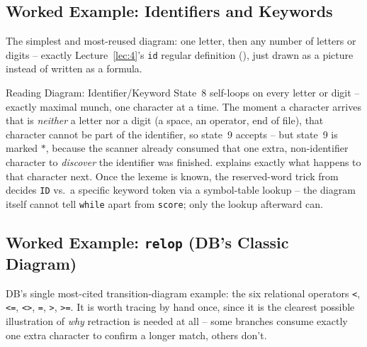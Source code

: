 \documentclass[full-course-notes.tex]{subfiles}
\begin{document}
\subsection{Worked Example: Identifiers and Keywords}
\label{sec:l7-diagram-id}

\dbtag The simplest and most-reused diagram: one letter, then any number of letters or digits
-- exactly Lecture~\ref{lec:4}'s \texttt{id} regular definition
(), just drawn as a picture instead of written as a
formula.

\begin{center}
\end{center}

\begin{examplebox}{Reading Diagram: Identifier/Keyword}
State~8 self-loops on every letter or digit -- exactly maximal munch, one character at a time.
The moment a character arrives that is \emph{neither} a letter nor a digit (a space, an
operator, end of file), that character cannot be part of the identifier, so state~9 accepts --
but state~9 is marked $*$, because the scanner already consumed that one extra, non-identifier
character to \emph{discover} the identifier was finished.  explains
exactly what happens to that character next. Once the lexeme is known, the reserved-word trick
from  decides \texttt{ID} vs.\ a specific keyword token via a symbol-table
lookup -- the diagram itself cannot tell \texttt{while} apart from \texttt{score}; only the
lookup afterward can.
\end{examplebox}

\subsection{Worked Example: \texttt{relop} (DB's Classic Diagram)}
\label{sec:l7-diagram-relop}

\dbtag DB's single most-cited transition-diagram example: the six relational operators
\texttt{<}, \texttt{<=}, \texttt{<>}, \texttt{=}, \texttt{>}, \texttt{>=}. It is worth tracing
by hand once, since it is the clearest possible illustration of \emph{why} retraction is
needed at all -- some branches consume exactly one extra character to confirm a longer match,
others don't.
\end{document}
